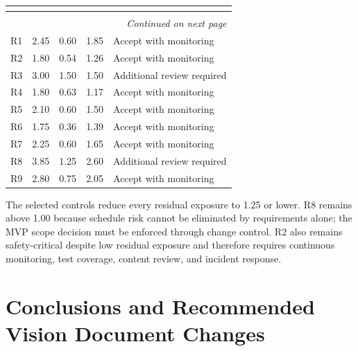 \documentclass[11pt,a4paper]{article}
\renewcommand{\arraystretch}{1.15}
\begin{document}
\begin{center}
\small
\setlength{\tabcolsep}{2.5pt}
\renewcommand{\arraystretch}{1.18}
\begin{longtable}{|p{1.8cm}|p{2.5cm}|p{2.5cm}|p{2.5cm}|p{6.2cm}|}
\hline
\rowcolor{headerblue} \textbf{\color{white}{Risk}} & \textbf{\color{white}{Initial RE}} & \textbf{\color{white}{Residual RE}} & \textbf{\color{white}{Reduction}} & \textbf{\color{white}{Residual treatment}} \\ \hline
\endfirsthead
\hline
\rowcolor{headerblue} \textbf{\color{white}{Risk}} & \textbf{\color{white}{Initial RE}} & \textbf{\color{white}{Residual RE}} & \textbf{\color{white}{Reduction}} & \textbf{\color{white}{Residual treatment}} \\ \hline
\endhead
\hline
\multicolumn{5}{r}{\small\itshape Continued on next page}\\
\endfoot
\hline
\endlastfoot
R1 & 2.45 & 0.60 & 1.85 & Accept with monitoring \\ \hline
R2 & 1.80 & 0.54 & 1.26 & Accept with monitoring \\ \hline
R3 & 3.00 & 1.50 & 1.50 & Additional review required \\ \hline
R4 & 1.80 & 0.63 & 1.17 & Accept with monitoring \\ \hline
R5 & 2.10 & 0.60 & 1.50 & Accept with monitoring \\ \hline
R6 & 1.75 & 0.36 & 1.39 & Accept with monitoring \\ \hline
R7 & 2.25 & 0.60 & 1.65 & Accept with monitoring \\ \hline
R8 & 3.85 & 1.25 & 2.60 & Additional review required \\ \hline
R9 & 2.80 & 0.75 & 2.05 & Accept with monitoring \\ \hline
\end{longtable}
\end{center}

The selected controls reduce every residual exposure to 1.25 or lower. R8 remains above 1.00 because schedule risk cannot be eliminated by requirements alone; the MVP scope decision must be enforced through change control. R2 also remains safety-critical despite low residual exposure and therefore requires continuous monitoring, test coverage, content review, and incident response.

\section{Conclusions and Recommended Vision Document Changes}
\end{document}
